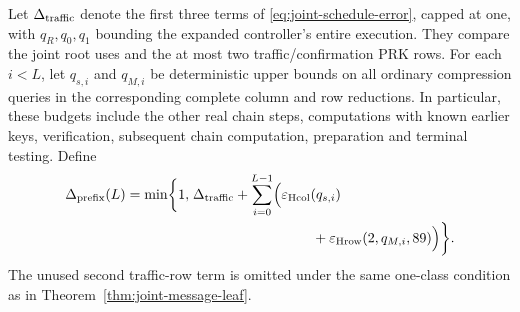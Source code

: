 \documentclass[pdflatex]{sn-jnl}
\theoremstyle{thmstyleone}
\theoremstyle{thmstylethree}
\theoremstyle{thmstyletwo}
\begin{document}
Let $\Delta_{\rm traffic}$ denote the first three terms of
\eqref{eq:joint-schedule-error}, capped at one, with $q_R,q_0,q_1$
bounding the expanded controller's entire execution. They compare the joint
root uses and the at most two traffic/confirmation PRK rows. For each
$i<L$, let $q_{s,i}$ and $q_{M,i}$ be deterministic upper bounds on
all ordinary compression queries in the corresponding complete
column and row reductions. In particular, these budgets include the
other real chain steps, computations with known earlier keys, verification, subsequent
chain computation, preparation and terminal testing. Define
\begin{equation}
\begin{split}
 \Delta_{\rm prefix}(L)=\min\biggl\{1,\;&\Delta_{\rm traffic}
  +\sum_{i=0}^{L-1}\Bigl(
       \varepsilon_{\rm Hcol}(q_{s,i})\\
 &\hspace{30mm}+\varepsilon_{\rm Hrow}(2,q_{M,i},89)
                         \Bigr)\biggr\}.
\end{split}
\label{eq:prefix-error}
\end{equation}
The unused second traffic-row term is omitted under the same
one-class condition as in Theorem~\ref{thm:joint-message-leaf}.
\end{document}
